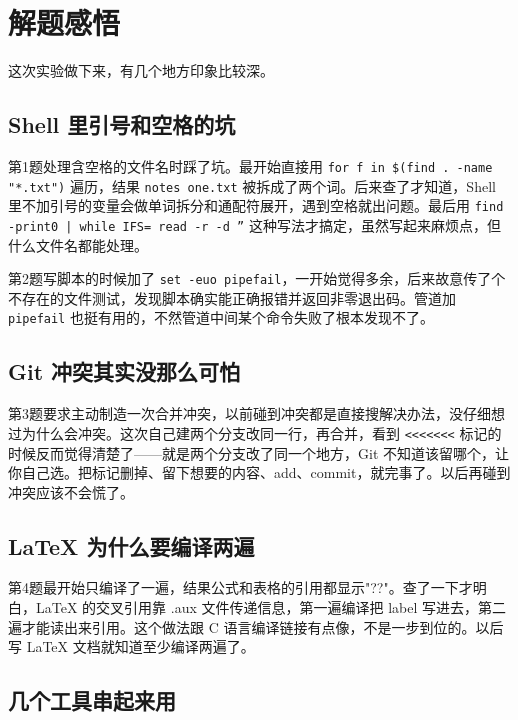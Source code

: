 \documentclass[12pt,a4paper]{article}
\begin{document}
\section{解题感悟}

这次实验做下来，有几个地方印象比较深。

\subsection{Shell 里引号和空格的坑}

第1题处理含空格的文件名时踩了坑。最开始直接用 \texttt{for f in \$(find . -name "*.txt")} 遍历，结果 \texttt{notes one.txt} 被拆成了两个词。后来查了才知道，Shell 里不加引号的变量会做单词拆分和通配符展开，遇到空格就出问题。最后用 \texttt{find -print0 | while IFS= read -r -d ''} 这种写法才搞定，虽然写起来麻烦点，但什么文件名都能处理。

第2题写脚本的时候加了 \texttt{set -euo pipefail}，一开始觉得多余，后来故意传了个不存在的文件测试，发现脚本确实能正确报错并返回非零退出码。管道加 \texttt{pipefail} 也挺有用的，不然管道中间某个命令失败了根本发现不了。

\subsection{Git 冲突其实没那么可怕}

第3题要求主动制造一次合并冲突，以前碰到冲突都是直接搜解决办法，没仔细想过为什么会冲突。这次自己建两个分支改同一行，再合并，看到 \texttt{<<<<<<<} 标记的时候反而觉得清楚了——就是两个分支改了同一个地方，Git 不知道该留哪个，让你自己选。把标记删掉、留下想要的内容、add、commit，就完事了。以后再碰到冲突应该不会慌了。

\subsection{LaTeX 为什么要编译两遍}

第4题最开始只编译了一遍，结果公式和表格的引用都显示"??"。查了一下才明白，LaTeX 的交叉引用靠 .aux 文件传递信息，第一遍编译把 label 写进去，第二遍才能读出来引用。这个做法跟 C 语言编译链接有点像，不是一步到位的。以后写 LaTeX 文档就知道至少编译两遍了。

\subsection{几个工具串起来用}
\end{document}
